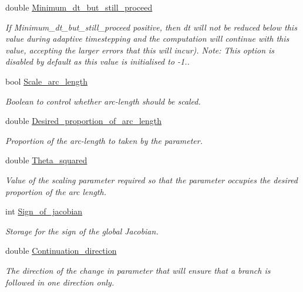 \begin{DoxyCompactItemize}
double \hyperlink{classoomph_1_1Problem_abdee700b2cec37540cf1e7e1462df6c3}{Minimum\+\_\+dt\+\_\+but\+\_\+still\+\_\+proceed}
\begin{DoxyCompactList}\small\item\em If Minimum\+\_\+dt\+\_\+but\+\_\+still\+\_\+proceed positive, then dt will not be reduced below this value during adaptive timestepping and the computation will continue with this value, accepting the larger errors that this will incur). Note\+: This option is disabled by default as this value is initialised to -\/1.. \end{DoxyCompactList}\item 
bool \hyperlink{classoomph_1_1Problem_a708322baf423e373970384006c2ca4db}{Scale\+\_\+arc\+\_\+length}
\begin{DoxyCompactList}\small\item\em Boolean to control whether arc-\/length should be scaled. \end{DoxyCompactList}\item 
double \hyperlink{classoomph_1_1Problem_a37fb791188428c8186ffd5c52b6cf576}{Desired\+\_\+proportion\+\_\+of\+\_\+arc\+\_\+length}
\begin{DoxyCompactList}\small\item\em Proportion of the arc-\/length to taken by the parameter. \end{DoxyCompactList}\item 
double \hyperlink{classoomph_1_1Problem_a123843ca2ed6384342939ef2b19477ef}{Theta\+\_\+squared}
\begin{DoxyCompactList}\small\item\em Value of the scaling parameter required so that the parameter occupies the desired proportion of the arc length. \end{DoxyCompactList}\item 
int \hyperlink{classoomph_1_1Problem_aca97d61840e46edc914e3cb4b98fd437}{Sign\+\_\+of\+\_\+jacobian}
\begin{DoxyCompactList}\small\item\em Storage for the sign of the global Jacobian. \end{DoxyCompactList}\item 
double \hyperlink{classoomph_1_1Problem_a6904003416e9a9257db70c009bdc69ed}{Continuation\+\_\+direction}
\begin{DoxyCompactList}\small\item\em The direction of the change in parameter that will ensure that a branch is followed in one direction only. \end{DoxyCompactList}\item 

\end{DoxyCompactItemize}
